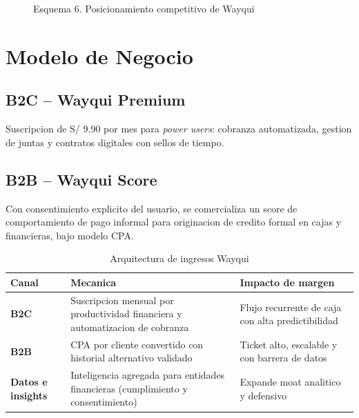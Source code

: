 \documentclass[11pt,a4paper]{article}
\begin{document}
\begin{figure}[htbp]
\centering
{}
\caption{Esquema 6. Posicionamiento competitivo de Wayqui}
\label{fig:posicionamiento}
\end{figure}

\section{Modelo de Negocio}
\subsection{B2C -- Wayqui Premium}
Suscripcion de S/ 9.90 por mes para \textit{power users}: cobranza automatizada, gestion de juntas y contratos digitales con sellos de tiempo.

\subsection{B2B -- Wayqui Score}
Con consentimiento explicito del usuario, se comercializa un score de comportamiento de pago informal para originacion de credito formal en cajas y financieras, bajo modelo CPA.

\begin{table}[htbp]
\centering
\caption{Arquitectura de ingresos Wayqui}
\begin{tabularx}{\textwidth}{>{\bfseries}p{2.5cm}X X}
\toprule
Canal & Mecanica & Impacto de margen \\
\midrule
B2C & Suscripcion mensual por productividad financiera y automatizacion de cobranza & Flujo recurrente de caja con alta predictibilidad \\
B2B & CPA por cliente convertido con historial alternativo validado & Ticket alto, escalable y con barrera de datos \\
Datos e insights & Inteligencia agregada para entidades financieras (cumplimiento y consentimiento) & Expande moat analitico y defensivo \\
\bottomrule
\end{tabularx}
\end{table}
\end{document}
